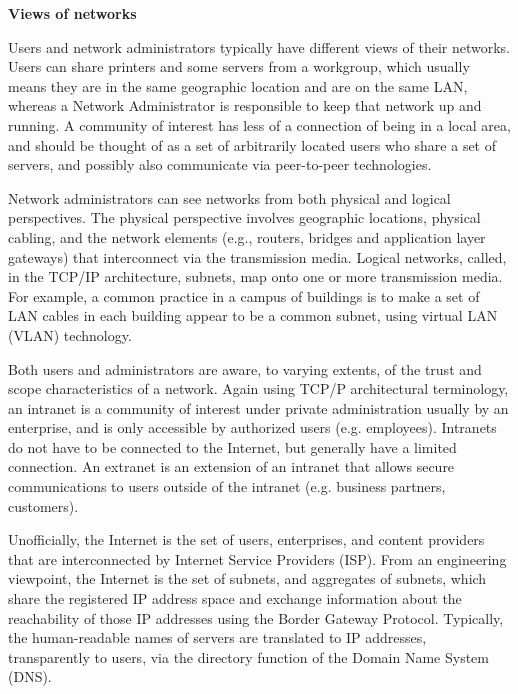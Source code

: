 \documentclass[a4paper]{article}
\begin{document}
\begin{enumerate}[label={\textbf{\Roman*.}},leftmargin=0pt,itemindent=*]
  \newpage


    \begin{center}
      \textbf{Views of networks}
    \end{center}

    Users and network administrators typically have different views of their
    networks. Users can share printers and some servers from a workgroup, which
    usually means they are in the same geographic location and are on the same
    LAN, whereas a Network Administrator is responsible to keep that network up
    and running. A community of interest has less of a connection of being in a
    local area, and should be thought of as a set of arbitrarily located users
    who share a set of servers, and possibly also communicate via peer-to-peer
    technologies.

    Network administrators can see networks from both physical and logical
    perspectives. The physical perspective involves geographic locations,
    physical cabling, and the network elements (e.g., routers, bridges and
    application layer gateways) that interconnect via the transmission media.
    Logical networks, called, in the TCP/IP architecture, subnets, map onto one
    or more transmission media. For example, a common practice in a campus of
    buildings is to make a set of LAN cables in each building appear to be a
    common subnet, using virtual LAN (VLAN) technology.

    Both users and administrators are aware, to varying extents, of the trust
    and scope characteristics of a network. Again using TCP/P architectural
    terminology, an intranet is a community of interest under private
    administration usually by an enterprise, and is only accessible by
    authorized users (e.g. employees). Intranets do not have to be connected to
    the Internet, but generally have a limited connection. An extranet is an
    extension of an intranet that allows secure communications to users outside
    of the intranet (e.g. business partners, customers).

    Unofficially, the Internet is the set of users, enterprises, and content
    providers that are interconnected by Internet Service Providers (ISP). From
    an engineering viewpoint, the Internet is the set of subnets, and aggregates
    of subnets, which share the registered IP address space and exchange
    information about the reachability of those IP addresses using the Border
    Gateway Protocol. Typically, the human-readable names of servers are
    translated to IP addresses, transparently to users, via the directory
    function of the Domain Name System (DNS).


\end{enumerate}
\end{document}
